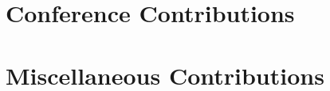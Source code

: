 \section*{Conference Contributions}

\begin{refsection}
\nocite{
gunter2010using,
ditmar2010mitigation,
hashemi2010contribution,
gunter2011investigation,
gunter2012potential,
doornbos2012thermospheric,
Olsen2013,
doornbos2013air,
bruinsma2014results,
iran2014search,
astafyeva2015ionospheric,
doornbos2015processing,
Siemes2015,
jaggi2016european,
sneew2016esa,
siemes2016improvements,
doornbos2016thermospheric}
\printbibliography
\end{refsection}


\section*{Miscellaneous Contributions}

\begin{refsection}
\nocite{
Iran-Pour2015,
Anselmi2010}
\printbibliography
\end{refsection}







